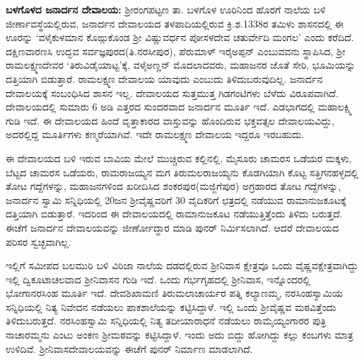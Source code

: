 \textbf{ಬಳಗೊಳದ ಜನಾರ್ದನ ದೇವಾಲಯ:} ಶ‍್ರೀರಂಗಪಟ್ಟಣ ತಾ. ಬಳಗೊಳ ಊರಿನಿಂದ ಹೊರಗೆ ನಾಲೆಯ ಬಳಿ ಜೀರ್ಣಾವಸ್ಥೆಯಲ್ಲಿರುವ, ಜನಾರ್ದನ ದೇವಾಲಯದ ತಳಪಾದಿಯಲ್ಲಿರುವ ಕ್ರಿ.ಶ.1338ರ ತಮಿಳು ಶಾಸನದಲ್ಲಿ ಈ ಊರನ್ನು ‘ವಳೈಕುಳಮಾನ ಕೊಙ್ಗುಕೊಂಡ ಶ‍್ರೀ ವಿಷ್ಣುವರ್ಧನ ಪೋಸಳದೇವ ಚತುರ್ವೇದಿ ಮಂಗಲ’ ಎಂದು ಕರೆದಿದೆ. ದಕ್ಷಿಣವಾರಣಸಿ ಉದ್ಭವ ಸರ್ವಜ್ಞಪುರದ(ತಿ.ನರಸೀಪುರ), ಪೆರುಮಾಳ್​ ಇರೈಅಪ್ಪನ್​ ಎಂಬುವವನು ಸ್ಥಾಪಿಸಿದ, ಶ‍್ರೀ ರಾಮಲಕ್ಷ್ಮಣದೇವರ ‘ತಿರುವಿಡೈಯಾಟ್ಟ’ಕ್ಕೆ, ವಳೈಅಣ್ಣನ್​ ಮೊದಲಾದವರು, ಮಹಾಜನರ ಜೊತೆ ಸೇರಿ, ಭೂಮಿಯನ್ನು ದತ್ತಿಯಾಗಿ ಬಿಡುತ್ತಾರೆ. ರಾಮಲಕ್ಷ್ಮಣ ದೇವಾಲಯ ಯಾವುದು ಎಂಬುದು ತಿಳಿದುಬರುವುದಿಲ್ಲ. ಜನಾರ್ದನ ದೇವಾಲಯಕ್ಕೆ ಸಂಬಂಧಿಸಿದ ಶಾಸನ ಇಲ್ಲ. ದೇವಾಲಯದ ಸುತ್ತಮುತ್ತ ಗಿಡಗಂಟಿಗಳು ಬೆಳೆದು ವಿರೂಪವಾಗಿದೆ. ದೇವಾಲಯದಲ್ಲಿ ಸುಮಾರು 6 ಅಡಿ ಎತ್ತರದ ಸುಂದರವಾದ ಜನಾರ್ದನ ಮೂರ್ತಿ ಇದೆ. ಎಡಭಾಗದಲ್ಲಿ ಮಹಾಲಕ್ಷ್ಮಿ ಗುಡಿ ಇದೆ. ಈ ದೇವಾಲಯದ ಹಿಂದೆ ವೃತ್ತಾಕಾರದ ವಾಸ್ತುವನ್ನು ಹೊಂದಿರುವ ಭಕ್ತವತ್ಸಲ ದೇವಾಲಯವಿದ್ದು, ಅದರಲ್ಲಿದ್ದ ಮೂರ್ತಿಗಳು ಕಣ್ಮರೆಯಾಗಿವೆ. ಇದೇ ರಾಮಲಕ್ಷ್ಮಣ ದೇವಾಲಯ ಇದ್ದರೂ ಇರಬಹುದು.

ಈ ದೇವಾಲಯದ ಬಳಿ ಇರುವ ಬಾವಿಯ ಮೇಲೆ ಮುಚ್ಚಿರುವ ಕಲ್ಲಿನಲ್ಲಿ, ಮೈಸೂರು ಚಾಮರಸ ಒಡೆಯರ ಮಕ್ಕಳು, ಬೆಟ್ಟದ ಚಾಮರಸ ಒಡೆಯರು, ರಾಮರಾಜಯ್ಯನ ಮಗ ತಿರುಮಲರಾಜಯ್ಯನು ಕೊಡಗಿಯಾಗಿ ಕೊಟ್ಟ ಸತ್ತಿಗನಹಳ್ಳದಲ್ಲಿ ತೋಟ ಗದ್ದೆಗಳನ್ನು, ಮಹಾಜನಗಳಿಂದ ಖರೀದಿಸಿದ ಶಂಕರಪುರ(ಮಜ್ಜಿಗೆಪುರ) ಅಗ್ರಹಾರದ ತೋಟ ಗದ್ದೆಗಳನ್ನು, ಜನಾರ್ದನ ಸ್ವಾಮಿ ಸನ್ನಿಧಿಯಲ್ಲಿ 20ಜನ ಶ‍್ರೀವೈಷ್ಣವರಿಗೆ 30 ವೈದಿಕರಿಗೆ ಛತ್ರದಲ್ಲಿ ನಡೆಯುವ ರಾಮಾನುಜಕೂಟಕ್ಕೆ ದತ್ತಿಯಾಗಿ ಬಿಡುತ್ತಾರೆ. ಇದರಿಂದ ಈ ದೇವಾಲಯದಲ್ಲಿ ರಾಮಾನುಜಕೂಟ ನಡೆಯುತ್ತಿತ್ತೆಂದು ತಿಳಿದು ಬರುತ್ತದೆ. ಈಚೆಗೆ ಜನಾರ್ದನ ದೇವಾಲಯವನ್ನು ಜೀರ್ಣೋದ್ಧಾರ ಮಾಡಿ ಪುನರ್ ನಿರ್ಮಿಸಲಾಗಿದೆ. ಆದರೆ ದೇವಾಲಯದ ಪರಿಸರ ಸ್ವಚ್ಛವಾಗಿಲ್ಲ.

ಇಲ್ಲಿಗೆ ಸಮೀಪದ ಬಲಮುರಿ ಬಳಿ ವಿರಿಜಾ ನಾಲೆಯ ದಡದಲ್ಲಿರುವ ಶ‍್ರೀನಿವಾಸ ಕ್ಷೇತ್ರವೂ ಒಂದು ವೈಷ್ಣವಕ್ಷೇತ್ರ\-ವಾಗಿದ್ದು ಇಲ್ಲಿ ದ್ವಿಕೂಟಾಚಲವಾದ ಶ‍್ರೀನಿವಾಸನ ಗುಡಿ ಇದೆ. ಒಂದು ಗರ್ಭಗೃಹದಲ್ಲಿ ಶ‍್ರೀನಿವಾಸ, ಇನ್ನೊಂದರಲ್ಲಿ ಭೋಗಾನರಸಿಂಹ ಮೂರ್ತಿ ಇದೆ. ದೇವಶಿಖಾಮಣಿ ತಿರುಮಲಾಚಾರ್ಯರ ಪತ್ನಿ ಕಲ್ಯಾಣಮ್ಮ, ನರಸಿಂಹಸ್ವಾಮಿಯ ಸನ್ನಿಧಿಯಲ್ಲಿ ನಿತ್ಯ ನಿವೇದನ ನಡೆಯಲು ಪಾಕಶಾಲೆಯನ್ನು ಕಟ್ಟಿಸಿದ್ದಾಳೆ. ಇಲ್ಲಿ ಒಂದು ಶ‍್ರೀವೈಷ್ಣವ ಮಠವಿತ್ತೆಂದು ತಿಳಿದುಬರುತ್ತದೆ. ನರಸಿಂಹಸ್ವಾಮಿ ಸನ್ನಿಧಿಯಲ್ಲಿ ನಿತ್ಯ ತದೀಯಾರಾಧನೆ ನಡೆಯಲು ರಾಮೈಯ್ಯಂಗಾರರ ಪುತ್ರಿ ನಾಚಾರಮ್ಮನು ಎಂಟು ಅಂಕಣ ಶ‍್ರೀಮಠವನ್ನು ಕಟ್ಟಿಸಿದ್ದಾಳೆ. ಇಂದು ಅದು ಬಿದ್ದು ಹೋಗಿದ್ದು ಕಲ್ಲು ಕಂಬಗಳು ಮಾತ್ರ ಉಳಿದಿವೆ. ಶ‍್ರೀನಿವಾಸದೇವಾಲಯವನ್ನು ಈಚೆಗೆ ಪುನರ್​ ನಿರ್ಮಾಣ ಮಾಡಲಾಗಿದೆ.

